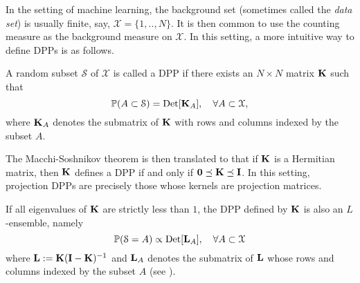 In the setting of machine learning, the background set (sometimes called the \emph{data set}) is usually finite, say, $\mathcal X = \{1,..,N\}$. It is then common to use the counting measure as the background measure on $\mathcal X$. In this setting, a more intuitive way to define DPPs is as follows. 

\begin{definition} \label{def:DPPdef}
    A random subset $\mathcal S$ of $\mathcal X$ is called a DPP if there exists an $N\times N$ matrix $\mathbf{K}$ such that
    \[ \mathbb P(A\subset \mathcal S) = \mathrm{Det} [\mathbf{K}_{A}], \quad \forall A\subset \mathcal X,\]
    where $\mathbf{K}_A$ denotes the submatrix of $\mathbf{K}$ with rows and columns indexed by the subset $A$.
\end{definition} 


    The Macchi-Soshnikov theorem is then translated to that if $\mathbf{K}$ is a Hermitian matrix, then $\mathbf{K}$ defines a DPP if and only if $\mathbf{0} \preceq \mathbf{K} \preceq \mathbf I $. 
    In this setting, projection DPPs are precisely those whose kernels are projection matrices.
    
    If all eigenvalues of $\mathbf{K}$ are strictly less than $1$, the DPP defined by $\mathbf{K}$ is also an $L$-ensemble, namely
    \[ \mathbb P(\mathcal S= A) \propto \mathrm{Det} [\mathbf{L}_A], \quad \forall A\subset \mathcal X\]
    where $\mathbf{L}:= \mathbf{K}(\mathbf{I} - \mathbf{K})^{-1}$ and $\mathbf{L}_A$ denotes the submatrix of $\mathbf{L}$ whose rows and columns indexed by the subset $A$ (see \cite{kulesza_determinantal_2012}).

\begin{comment}
    DPPs are often used to sample diverse subsets. A first insight on this statement is to notice that DPPs introduce negative correlation between the elements of the ground set. Indeed, for $i \neq j$, one can notice that:  $\mathbb{P}_{\operatorname{DPP}}(\{ i,j \} \subset \mathcal{S}) = \mathbb{P}_{\operatorname{DPP}}(i \in \mathcal{S})\mathbb{P}_{\operatorname{DPP}}(j \in \mathcal{S}) - K_{ij}^2$
\end{comment}

